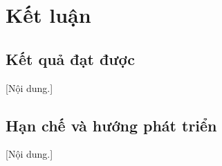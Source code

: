 \chapter{Kết luận}\label{chapter:conclusion}
\pagestyle{fancy}

\section{Kết quả đạt được}
[Nội dung.]

\section{Hạn chế và hướng phát triển}
[Nội dung.]
